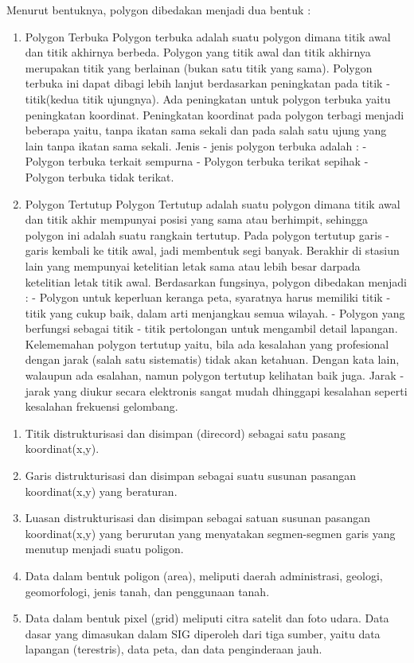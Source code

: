 Menurut bentuknya, polygon dibedakan menjadi dua bentuk :
\begin{enumerate}
\item Polygon Terbuka
Polygon terbuka adalah suatu polygon dimana titik awal dan titik akhirnya berbeda. Polygon yang titik awal dan titik akhirnya merupakan titik yang berlainan (bukan satu titik yang sama). Polygon terbuka ini dapat dibagi lebih lanjut berdasarkan peningkatan pada titik - titik(kedua titik ujungnya). Ada peningkatan untuk polygon terbuka yaitu peningkatan koordinat. Peningkatan koordinat pada polygon terbagi menjadi beberapa yaitu, tanpa ikatan sama sekali dan pada salah satu ujung yang lain tanpa ikatan sama sekali. Jenis - jenis polygon terbuka adalah :
- Polygon terbuka terkait sempurna
- Polygon terbuka terikat sepihak
- Polygon terbuka tidak terikat.

\item Polygon Tertutup
Polygon Tertutup adalah suatu polygon dimana titik awal dan titik akhir mempunyai posisi yang sama atau berhimpit, sehingga polygon ini adalah suatu rangkain tertutup. Pada polygon tertutup garis - garis kembali ke titik awal, jadi membentuk segi banyak. Berakhir di stasiun lain yang mempunyai ketelitian letak sama atau lebih besar darpada ketelitian letak titik awal.
Berdasarkan fungsinya, polygon dibedakan menjadi :
- Polygon untuk keperluan keranga peta, syaratnya harus memiliki titik - titik yang cukup baik, dalam arti menjangkau semua wilayah.
- Polygon yang berfungsi sebagai titik - titik pertolongan untuk mengambil detail lapangan.
Kelememahan polygon tertutup yaitu, bila ada kesalahan yang profesional dengan jarak (salah  satu sistematis) tidak akan ketahuan. Dengan kata lain, walaupun ada esalahan, namun polygon tertutup kelihatan baik juga. Jarak - jarak yang diukur secara elektronis sangat mudah dhinggapi kesalahan seperti kesalahan frekuensi gelombang.
\end{enumerate}

\begin{enumerate}
\item Titik distrukturisasi dan disimpan (direcord) sebagai satu pasang koordinat(x,y).
\item Garis distrukturisasi dan disimpan sebagai suatu susunan pasangan koordinat(x,y) yang beraturan.
\item Luasan distrukturisasi dan disimpan sebagai satuan susunan pasangan koordinat(x,y) yang berurutan yang menyatakan segmen-segmen garis yang menutup menjadi suatu poligon.
\item Data dalam bentuk poligon (area), meliputi daerah administrasi, geologi, geomorfologi, jenis tanah, dan penggunaan tanah. 
\item Data dalam bentuk pixel (grid) meliputi citra satelit dan foto udara. Data dasar yang dimasukan dalam SIG diperoleh dari tiga sumber, yaitu data lapangan (terestris), data peta, dan data penginderaan jauh.
\end{enumerate}

